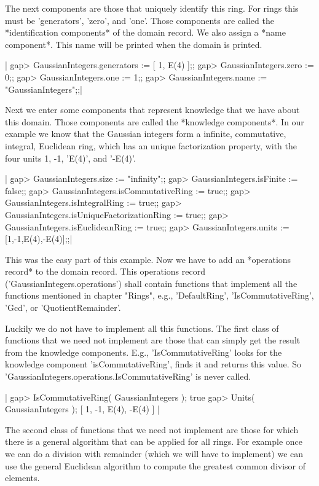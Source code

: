 The  next components  are those  that  uniquely  identify this ring.  For
rings this must be 'generators', 'zero', and 'one'.  Those components are
called  the *identification components* of  the  domain  record.  We also
assign a *name component*.  This name will be printed when the  domain is
printed.

|    gap> GaussianIntegers.generators := [ 1, E(4) ];;
    gap> GaussianIntegers.zero := 0;;
    gap> GaussianIntegers.one := 1;;
    gap> GaussianIntegers.name := "GaussianIntegers";;|

Next we enter some components that represent knowledge that we have about
this domain.  Those components are called the *knowledge components*.  In
our  example  we  know  that  the  Gaussian  integers  form  a  infinite,
commutative,  integral, Euclidean ring, which has an unique factorization
property, with the four units 1, -1, 'E(4)', and '-E(4)'.

|    gap> GaussianIntegers.size                       := "infinity";;
    gap> GaussianIntegers.isFinite                   := false;;
    gap> GaussianIntegers.isCommutativeRing          := true;;
    gap> GaussianIntegers.isIntegralRing             := true;;
    gap> GaussianIntegers.isUniqueFactorizationRing  := true;;
    gap> GaussianIntegers.isEuclideanRing            := true;;
    gap> GaussianIntegers.units                      := [1,-1,E(4),-E(4)];;|

This was  the  easy  part of  this  example.   Now  we  have  to  add  an
*operations  record*  to  the  domain  record.   This  operations  record
('GaussianIntegers.operations') shall  contain functions  that  implement
all  the functions mentioned  in  chapter  "Rings", e.g.,  'DefaultRing',
'IsCommutativeRing', 'Gcd', or 'QuotientRemainder'.

Luckily we do not have to implement  all this functions.  The first class
of functions that we need not implement are those that can simply get the
result from the  knowledge  components.  E.g., 'IsCommutativeRing'  looks
for   the knowledge component 'isCommutativeRing',   finds it and returns
this value.  So 'GaussianIntegers.operations.IsCommutativeRing' is  never
called.

|    gap> IsCommutativeRing( GaussianIntegers );
    true
    gap> Units( GaussianIntegers );
    [ 1, -1, E(4), -E(4) ] |

The second class of functions  that we need  not implement are those  for
which  there  is a  general algorithm  that can be applied for all rings.
For example once we can do a division with remainder (which  we will have
to  implement) we can use the  general Euclidean algorithm to compute the
greatest common divisor of elements.

